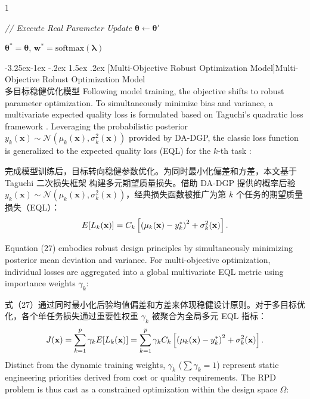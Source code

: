 \documentclass[11pt]{article}
\makeatletter
\renewcommand\subsection{\@startsection{subsection}{2}{\z@}%
                                         {-3.25ex\@plus -1ex \@minus -.2ex}%
                                         {1.5ex \@plus .2ex}%
                                         {\normalfont\fontfamily{phv}\fontsize{14}{17}\bfseries}}
\newcommand{\bisubsection}[2]{\subsection[#1]{#1\protect\\#2}}
\makeatother
\begin{document}
\begin{algorithm}[!h]
\begin{spacing}{1}
\begin{algorithmic}[1]
		\State \textit{// Execute Real Parameter Update}
		\State $\boldsymbol{\theta} \gets \boldsymbol{\theta}'$
		\EndFor
		
		\State \Return $\boldsymbol{\theta}^* = \boldsymbol{\theta}$, $\mathbf{w}^* = \text{softmax}(\boldsymbol{\lambda})$
	\end{algorithmic}
\end{spacing}
\end{algorithm}

\bisubsection{Multi-Objective Robust Optimization Model}{多目标稳健优化模型} \label{s:sec3.3}
Following model training, the objective shifts to robust parameter optimization. To simultaneously minimize bias and variance, a multivariate expected quality loss is formulated based on Taguchi's quadratic loss framework \citep{Taguchi1986}. Leveraging the probabilistic posterior $y_{k}(\mathbf{x})\sim\mathcal{N}(\mu_{k}(\mathbf{x}),\sigma _{k}^{2}(\mathbf{x}))$ provided by DA-DGP, the classic loss function is generalized to the expected quality loss (EQL) for the $k$-th task \citep{Tan2012, Jiang2021}:

完成模型训练后，目标转向稳健参数优化。为同时最小化偏差和方差，本文基于 Taguchi 二次损失框架 \citep{Taguchi1986} 构建多元期望质量损失。借助 DA-DGP 提供的概率后验 $y_{k}(\mathbf{x})\sim\mathcal{N}(\mu_{k}(\mathbf{x}),\sigma _{k}^{2}(\mathbf{x}))$，经典损失函数被推广为第 $k$ 个任务的期望质量损失（EQL）\citep{Tan2012, Jiang2021}：
\begin{equation}
	E[{L_k}({\bf{x}})] = {C_k}\left[ {{{({\mu _k}({\bf{x}}) - y_k^*)}^2} + \sigma _k^2({\bf{x}})} \right].
\end{equation}

Equation (27) embodies robust design principles by simultaneously minimizing posterior mean deviation and variance. For multi-objective optimization, individual losses are aggregated into a global multivariate EQL metric using importance weights $\gamma_k$:

式（27）通过同时最小化后验均值偏差和方差来体现稳健设计原则。对于多目标优化，各个单任务损失通过重要性权重 $\gamma_k$ 被聚合为全局多元 EQL 指标：
\begin{equation}
	J({\bf{x}}) = \sum\limits_{k = 1}^p {{\gamma _k}} E[{L_k}({\bf{x}})] = \sum\limits_{k = 1}^p {{\gamma _k}} {C_k}\left[ {{{({\mu _k}({\bf{x}}) - y_k^*)}^2} + \sigma _k^2({\bf{x}})} \right].
\end{equation}
Distinct from the dynamic training weights, $\gamma_{k}$ ($\sum\gamma_{k}=1$) represent static engineering priorities derived from cost or quality requirements. The RPD problem is thus cast as a constrained optimization within the design space $\Omega$:
\end{document}
